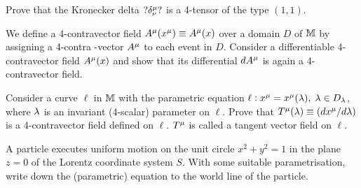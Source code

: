 \exise Prove that the Kronecker delta $?\delta^{{\mu}}_{{\nu}}?$ 
is a 4-tensor of the type $(1,1)$.

\exise We define a 4-contravector field $A^{{\mu}}(x^{{\mu}}) 
\equiv  A^{{\mu}}(x)$ over a domain $D$ of $\mathbb{M}$ by 
assigning a 4-contra  -vector $A^{{\mu}}$ to each event in $D$. 
Consider a differentiable 4-contravector field $A^{{\mu}}(x)$ 
and show that its differential $dA^{{\mu}}$ is again a 
4-contravector field.

\exise Consider a {curve $\ell$ in $\mathbb{M}$  with the 
parametric equation} $ \ell : x^{{\mu}}=x^{{\mu}}({\lambda}), \; 
{\lambda}\in D_{{\lambda}}$, where ${\lambda}$ is an invariant (4-scalar) 
parameter on $\ell$. Prove that $T^{{\mu}}({\lambda})\equiv 
(dx^{{\mu}}/d{\lambda})$ is a 4-contravector field defined on 
$\ell$. $T^{{\mu}}$ is called a {tangent vector field} on 
$\ell$.

\exise A particle executes uniform motion on the unit circle 
$ x^2+y^2=1 $ in the plane $z=0$ of the Lorentz coordinate 
system $S$. With some suitable parametrisation, write down 
the (parametric) equation to the world line of the particle.
